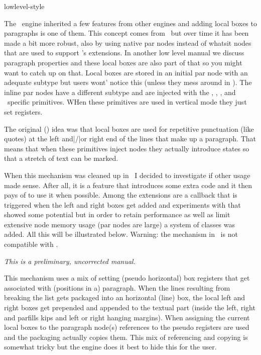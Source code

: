 

\environment lowlevel-style

\startdocument
  [title=localboxes,
   color=middlered]

\startsectionlevel[title=Introduction]

The \LUATEX\ engine inherited a few features from other engines and adding local
boxes to paragraphs is one of them. This concept comes from \OMEGA\ but over time
it has been made a bit more robust, also by using native par nodes instead of
whatsit nodes that are used to support \TEX's extensions. In another low level
manual we discuss paragraph properties and these local boxes are also part of
that so you might want to catch up on that. Local boxes are stored in an initial
par node with an adequate subtype but users wont' notice this (unless they mess
around in \LUA). The inline par nodes have a different subtype and are injected
with the \typ {\localinterlinepenalty}, \typ {\localbrokenpenalty}, \typ
{\localleftbox}, \typ {\localrightbox} and \LUAMETATEX\ specific \typ
{\localmiddlebox} primitives. WHen these primitives are used in vertical mode
they just set registers.

The original (\OMEGA) idea was that local boxes are used for repetitive
punctuation (like quotes) at the left and|/|or right end of the lines that make
up a paragraph. That means that when these primitives inject nodes they actually
introduce states so that a stretch of text can be marked.

When this mechanism was cleaned up in \LUAMETATEX\ I decided to investigate if
other usage made sense. After all, it is a feature that introduces some extra
code and it then pays of to use it when possible. Among the extensions are a
callback that is triggered when the left and right boxes get added and
experiments with that showed some potential but in order to retain performance as
well as limit extensive node memory usage (par nodes are large) a system of
classes was added. All this will be illustrated below. Warning: the mechanism in
\LUAMETATEX\ is not compatible with \LUATEX.

{\em This is a preliminary, uncorrected manual.}

\stopsectionlevel

\startsectionlevel[title=The basics]

This mechanism uses a mix of setting (pseudo horizontal) box registers that get
associated with (positions in a) paragraph. When the lines resulting from
breaking the list gets packaged into an horizontal (line) box, the local left and
right boxes get prepended and appended to the textual part (inside the left,
right and parfills kips and left or right hanging margins). When assigning the
current local boxes to the paragraph node(s) references to the pseudo registers
are used and the packaging actually copies them. This mix of referencing and
copying is somewhat tricky but the engine does it best to hide this for the user.

